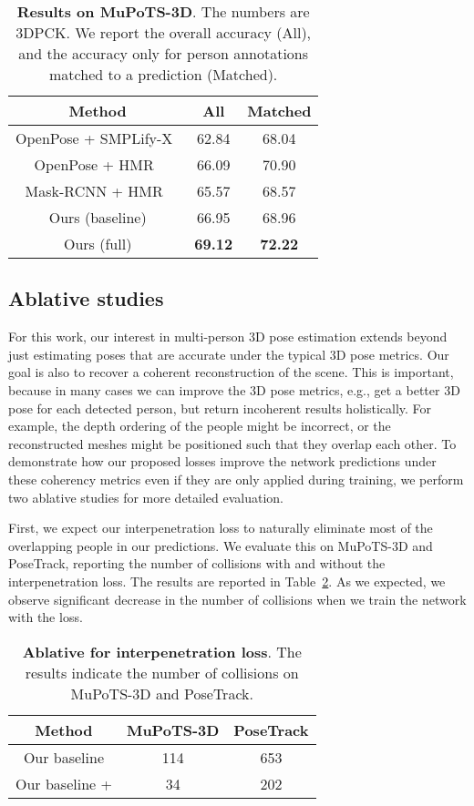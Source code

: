 \begin{table}\centering
	\begin{tabular}{c|c|c}
	\toprule
	Method & All & Matched\\
	\midrule	
	OpenPose + SMPLify-X~\cite{pavlakos2019expressive} & 62.84 & 68.04\\
	OpenPose + HMR~\cite{kanazawa2018end} & 66.09 & 70.90\\	
	Mask-RCNN + HMR~\cite{kanazawa2018end} & 65.57 & 68.57\\			
	Ours (baseline) & 66.95 & 68.96\\	
	Ours (full) & \textbf{69.12} & \textbf{72.22}\\
	\bottomrule
	\end{tabular}
	\caption{\textbf{Results on MuPoTS-3D}. The numbers are 3DPCK. We report the overall accuracy (All), and the accuracy only for person annotations matched to a prediction (Matched).}
	\label{table:mupots}
\end{table}

\subsection{Ablative studies} \label{sec:ablatives}
For this work, our interest in multi-person 3D pose estimation extends beyond just estimating poses that are accurate under the typical 3D pose metrics. Our goal is also to recover a coherent reconstruction of the scene. This is important, because in many cases we can improve the 3D pose metrics, e.g., get a better 3D pose for each detected person, but return incoherent results holistically. For example, the depth ordering of the people might be incorrect, or the reconstructed meshes might be positioned such that they overlap each other. To demonstrate how our proposed losses improve the network predictions under these coherency metrics even if they are only applied during training, we perform two ablative studies for more detailed evaluation.

First, we expect our interpenetration loss to naturally eliminate most of the overlapping people in our predictions. We evaluate this on MuPoTS-3D and PoseTrack, reporting the number of collisions with and without the interpenetration loss. The results are reported in Table~\ref{table:interpenetration}. As we expected, we observe significant decrease in the number of collisions when we train the network with the  loss.

\begin{table}\centering
	\begin{tabular}{c|c|c}
		\toprule
		Method & MuPoTS-3D & PoseTrack \\
		\midrule
	    Our baseline & 114 & 653 \\
	    Our baseline +   & 34 & 202 \\
		\bottomrule
	\end{tabular}
	\caption{\textbf{Ablative for interpenetration loss}. The results indicate the number of collisions on MuPoTS-3D and PoseTrack.}
	\vspace{-2mm}
	\label{table:interpenetration}
\end{table}

